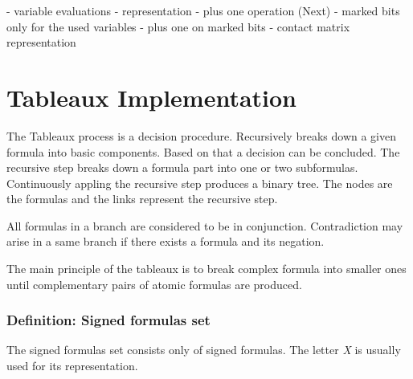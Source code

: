 \documentclass{article}
\begin{document}
	- variable evaluations - representation
		- plus one operation (Next)
		- marked bits only for the used variables
		- plus one on marked bits
	 - contact matrix representation


	 \iffalse
		Notes for the official documentation
	 - bitset-Next instead of bitet-PlusOne on marked and explain the marked before defining the
	 - variable bitset/boolean substitution does now explains anything and is confusing.
	 - Variable boolean substitution - how the substitution is done? And why we need it? What it's going to be used for?
	 - Term hash variable -> without 'variable', maybe 'member'.
	 - Term Set-Evaluation -> Maybe boolean valuation should be the correct name
	 - Variable Set-Substituitons -> maybe variable evalualuation instead of substituion. Now it's too complicated with this substituioning
	 - Term Set-Evaluation : $& |$ as cup and cap symbols maybe?
	  -
	\fi























	\newpage
	\section{Tableaux Implementation}
	The Tableaux process is a decision procedure. Recursively breaks down a given formula into basic components. Based on that a decision can be concluded. The recursive step breaks down a formula part into one or two subformulas. Continuously appling the recursive step produces a binary tree. The nodes are the formulas and the links represent the recursive step.

	All formulas in a branch are considered to be in conjunction. Contradiction may arise in a same branch if there exists a formula and its negation.

	The main principle of the tableaux is to break complex formula into smaller ones until complementary pairs of atomic formulas are produced.

	\subsubsection*{Definition: Signed formulas set}
	The signed formulas set consists only of signed formulas. The letter \textit{X} is usually used for its representation.
\end{document}
